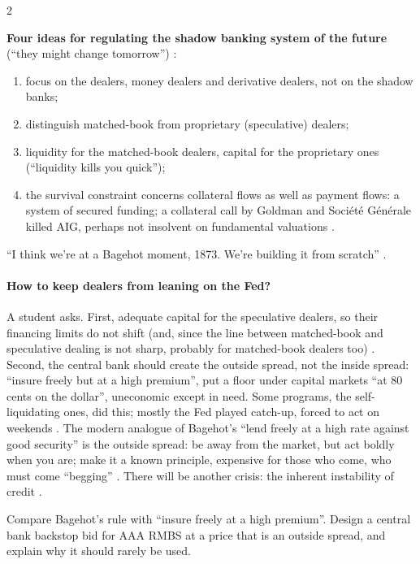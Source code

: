 \begin{paracol}{2}
\begin{keyformulas}
\textbf{Four ideas for regulating the shadow banking system of the future} (``they might change tomorrow'') :
\begin{enumerate}
  \item focus on the dealers, money dealers and derivative dealers, not on the shadow banks;
  \item distinguish matched-book from proprietary (speculative) dealers;
  \item liquidity for the matched-book dealers, capital for the proprietary ones (``liquidity kills you quick'');
  \item the survival constraint concerns collateral flows as well as payment flows: a system of secured funding; a collateral call by Goldman and Soci\'et\'e G\'en\'erale
        killed AIG, perhaps not insolvent on fundamental valuations .
\end{enumerate}
\end{keyformulas}

``I think we're at a Bagehot moment, 1873. We're building it from scratch'' .

\paragraph{How to keep dealers from leaning on the Fed?} A student asks. First, adequate capital for the speculative dealers, so their financing limits do not shift
(and, since the line between matched-book and speculative dealing is not sharp, probably for matched-book dealers too) .
Second, the central bank should create the outside spread, not the inside spread: ``insure freely but at a high premium'', put a floor under capital markets ``at 80 cents
on the dollar'', uneconomic except in need. Some programs, the self-liquidating ones, did this; mostly the Fed played catch-up, forced to act on weekends
. The modern analogue of Bagehot's ``lend freely at a high rate against good security'' is the outside spread: be away
from the market, but act boldly when you are; make it a known principle, expensive for those who come, who must come ``begging''
. There will be another crisis: the inherent instability of credit .

\flushside

\begin{exercise}
Compare Bagehot's rule with ``insure freely at a high premium''. Design a central bank backstop bid for AAA RMBS at a price that is an outside spread, and explain why it
should rarely be used.
\end{exercise}

\end{paracol}

